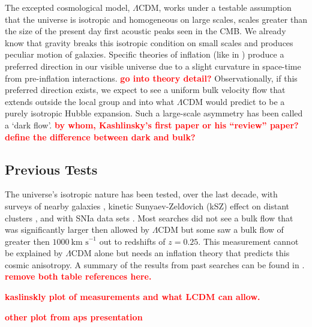 \documentclass[apj, iop]{emulateapj}
\newcommand{\sn}{SNIa}
\newcommand{\todo}[1]{\textbf{\textcolor{red}{#1}}}
\newcommand{\lcdm}{$\Lambda$CDM}     %
\newcommand{\kms}{\ensuremath{~\text{km s}^{-1}}}
\begin{document}
The excepted cosmological model, $\Lambda$CDM, works under a testable assumption
that the universe is isotropic and homogeneous on large scales, scales greater
than the size of the present day first acoustic peaks seen in the CMB.
We already
know that gravity breaks this isotropic condition on small scales and produces
peculiar motion of galaxies. Specific theories of inflation (like in
\cite{MersiniHoughton:2008io}) produce a preferred direction in our visible
universe due to a slight curvature in space-time from pre-inflation
interactions. \todo{go into theory detail?} Observationally, if this preferred
direction exists, we expect to see a  uniform bulk velocity flow that extends
outside the local group and into what $\Lambda$CDM would predict to be a purely
isotropic Hubble expansion. Such a large-scale asymmetry has been called a `dark
flow'. 
\todo{by whom, Kashlinsky's first paper or his ``review'' paper?}
\todo{define the difference between dark and bulk?}

\subsection{Previous Tests}\label{previous-tests}

The universe's isotropic nature has been tested, over the last decade, with
surveys of nearby galaxies \citep{Ma13}, kinetic Sunyaev-Zel\'{d}ovich (kSZ)
effect on distant clusters \citep{Kashlinsky10,Planckdf}, and with \sn{} data
sets \citep[and others as seen in ]{Dai11,Rathaus13}. Most
searches did not see a bulk flow that was significantly larger then allowed by
\lcdm{} but some saw a bulk flow of greater then $1000 \kms{}$ out to
redshifts of $z = 0.25$. This measurement cannot be explained by $\Lambda$CDM
alone but needs an inflation theory that predicts this cosmic anisotropy.  A
summary of the results from past searches can be found in .
\todo{remove both table references here.}

\todo{kaslinskly plot of measurements and what LCDM can allow.}

\todo{other plot from aps presentation}
\end{document}
